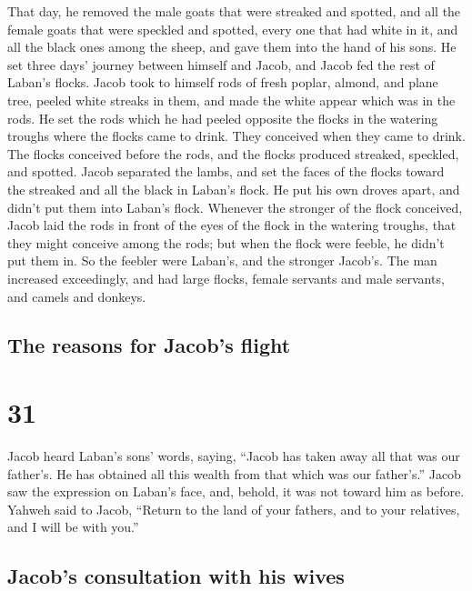  That day, he removed the male goats that were streaked
and spotted, and all the female goats that were speckled and spotted,
every one that had white in it, and all the black ones among the sheep,
and gave them into the hand of his sons.  He set three
days' journey between himself and Jacob, and Jacob fed the rest of
Laban's flocks.  Jacob took to himself rods of fresh
poplar, almond, and plane tree, peeled white streaks in them, and made
the white appear which was in the rods.  He set the rods
which he had peeled opposite the flocks in the watering troughs where
the flocks came to drink. They conceived when they came to drink.
 The flocks conceived before the rods, and the flocks
produced streaked, speckled, and spotted.  Jacob
separated the lambs, and set the faces of the flocks toward the streaked
and all the black in Laban's flock. He put his own droves apart, and
didn't put them into Laban's flock.  Whenever the
stronger of the flock conceived, Jacob laid the rods in front of the
eyes of the flock in the watering troughs, that they might conceive
among the rods;  but when the flock were feeble, he
didn't put them in. So the feebler were Laban's, and the stronger
Jacob's.  The man increased exceedingly, and had large
flocks, female servants and male servants, and camels and donkeys.

\hypertarget{the-reasons-for-jacobs-flight}{%
\subsection{The reasons for Jacob's
flight}\label{the-reasons-for-jacobs-flight}}

\hypertarget{section-30}{%
\section{31}\label{section-30}}

 Jacob heard Laban's sons' words, saying, ``Jacob has
taken away all that was our father's. He has obtained all this wealth
from that which was our father's.''  Jacob saw the
expression on Laban's face, and, behold, it was not toward him as
before.  Yahweh said to Jacob, ``Return to the land of
your fathers, and to your relatives, and I will be with you.''

\hypertarget{jacobs-consultation-with-his-wives}{%
\subsection{Jacob's consultation with his
wives}\label{jacobs-consultation-with-his-wives}}

